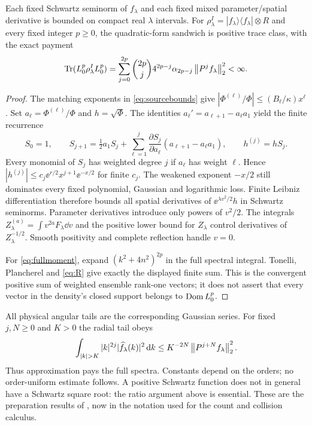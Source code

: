 \begin{proposition}\label{prop:state}
Each fixed Schwartz seminorm of $f_\lambda$ and each fixed mixed
parameter/spatial derivative is bounded on compact real $\lambda$ intervals.
For $\rho^I_\lambda=|f_\lambda\rangle\langle f_\lambda|\otimes R$ and every
fixed integer $p\ge0$, the quadratic-form sandwich is positive trace class,
with the exact payment
\begin{equation}\label{eq:fullmoment}
 \operatorname{Tr}(L_0^p\rho^I_\lambda L_0^p)
 =\sum_{j=0}^{2p}\binom{2p}{j}4^{2p-j}\alpha_{2p-j}
                                  \left\lVert P^jf_\lambda\right\rVert_2^2<\infty.
\end{equation}
\end{proposition}
\begin{proof}
The matching exponents in \eqref{eq:sourcebounds} give
$|\Phi^{(\ell)}/\Phi|\le(B_\ell/\kappa)x^\ell$.
Set $a_\ell=\Phi^{(\ell)}/\Phi$ and $h=\sqrt\Phi$.
The identities $a_\ell'=a_{\ell+1}-a_\ell a_1$ yield the finite recurrence
\begin{equation}\label{eq:sqrtrecurrence}
 S_0=1,\qquad
 S_{j+1}=\tfrac12a_1S_j+
 \sum_{\ell=1}^j\frac{\partial S_j}{\partial a_\ell}
                          (a_{\ell+1}-a_\ell a_1),\qquad h^{(j)}=hS_j.
\end{equation}
Every monomial of $S_j$ has weighted degree $j$ if $a_\ell$ has weight
$\ell$. Hence
$|h^{(j)}|\le c_j\ee^{r/2}x^{j+1}\ee^{-x/2}$ for finite $c_j$.
The weakened exponent $-x/2$ still dominates every fixed polynomial,
Gaussian and logarithmic loss. Finite Leibniz differentiation therefore
bounds all spatial derivatives of $\ee^{\lambda v^2/2}h$ in Schwartz
seminorms. Parameter derivatives introduce only powers of $v^2/2$.
The integrals $Z_\lambda^{(a)}=\int v^{2a}F_\lambda\dd v$ and the positive
lower bound for $Z_\lambda$ control derivatives of $Z_\lambda^{-1/2}$.
Smooth positivity and complete reflection handle $v=0$.

For \eqref{eq:fullmoment}, expand $(k^2+4n^2)^{2p}$ in the full spectral
integral. Tonelli, Plancherel and \eqref{eq:R} give exactly the displayed
finite sum. This is the convergent positive sum of weighted ensemble
rank-one vectors; it does not assert that every vector in the density's
closed support belongs to $\operatorname{Dom} L_0^p$.
\end{proof}

All physical angular tails are the corresponding Gaussian series. For
fixed $j,N\ge0$ and $K>0$ the radial tail obeys
\begin{equation}\label{eq:radialtail}
 \int_{|k|>K}|k|^{2j}|\widehat f_\lambda(k)|^2\dd k
 \le K^{-2N}\norm{P^{j+N}f_\lambda}_2^2.
\end{equation}
Thus approximation pays the full spectra. Constants depend on the orders;
no order-uniform estimate follows. A positive Schwartz function does not in
general have a Schwartz square root: the ratio argument above is essential.
These are the preparation results of \cite[Section 3]{TNDDirect}, now in the
notation used for the count and collision calculus.
